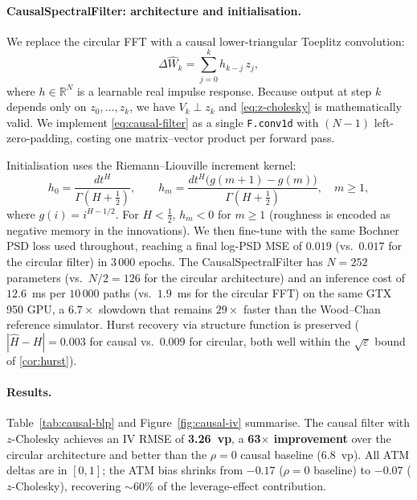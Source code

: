 \documentclass[11pt,a4paper]{article}
\begin{document}
\paragraph{CausalSpectralFilter: architecture and initialisation.}
We replace the circular FFT with a causal lower-triangular Toeplitz
convolution:
\begin{equation}
 \Delta\hat{W}_k = \sum_{j=0}^{k} h_{k-j}\,z_j,
 \label{eq:causal-filter}
\end{equation}
where $h \in \mathbb{R}^N$ is a learnable real impulse response.
Because output at step $k$ depends only on $z_0,\ldots,z_k$, we have
$V_k \perp z_k$ and \eqref{eq:z-cholesky} is mathematically valid.
We implement \eqref{eq:causal-filter} as a single \texttt{F.conv1d}
with $(N-1)$ left-zero-padding, costing one matrix–vector product per
forward pass.

Initialisation uses the Riemann--Liouville increment kernel:
\begin{equation}
 h_0 = \frac{dt^H}{\Gamma(H+\tfrac{1}{2})},
 \qquad
 h_m = \frac{dt^H\bigl(g(m+1)-g(m)\bigr)}{\Gamma(H+\tfrac{1}{2})},
 \quad m \geq 1,
 \label{eq:rl-init}
\end{equation}
where $g(i)=i^{H-1/2}$. For $H < \tfrac{1}{2}$, $h_m < 0$ for $m \geq 1$
(roughness is encoded as negative memory in the innovations). We then
fine-tune with the same Bochner PSD loss used throughout, reaching a
final log-PSD MSE of $0.019$ (vs.\ $0.017$ for the circular filter) in
$3\,000$ epochs. The CausalSpectralFilter has $N = 252$ parameters
(vs.\ $N/2 = 126$ for the circular architecture) and an inference cost
of $12.6$~ms per $10\,000$ paths (vs.\ $1.9$~ms for the circular FFT)
on the same GTX 950 GPU, a $6.7\times$ slowdown that remains
$29\times$ faster than the Wood--Chan reference simulator. Hurst
recovery via structure function is preserved
($|\hat{H}-H| = 0.003$ for causal vs.\ $0.009$ for circular, both well
within the $\sqrt{\varepsilon}$ bound of \cref{cor:hurst}).

\paragraph{Results.}
Table~\ref{tab:causal-blp} and Figure~\ref{fig:causal-iv} summarise.
The causal filter with $z$-Cholesky achieves an IV RMSE of
\textbf{3.26~vp}, a \textbf{63$\times$ improvement} over the circular
architecture and better than the $\rho=0$ causal baseline (6.8~vp).
All ATM deltas are in $[0,1]$; the ATM bias shrinks from $-0.17$
($\rho=0$ baseline) to $-0.07$ ($z$-Cholesky), recovering $\sim\!60\%$
of the leverage-effect contribution.
\end{document}
